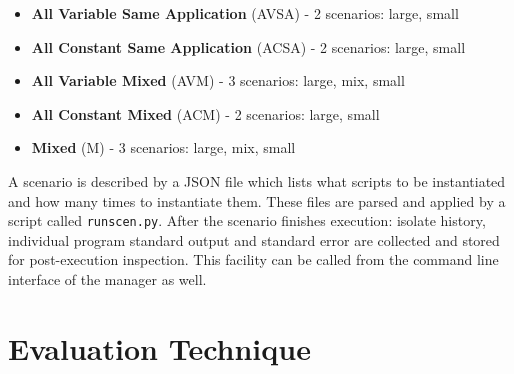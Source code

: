 \documentclass{l4proj}
\begin{document}
\begin{itemize}
\item \textbf{All Variable Same Application} (AVSA) - 2 scenarios: large, small
\item \textbf{All Constant Same Application} (ACSA) - 2 scenarios: large, small
\item \textbf{All Variable Mixed} (AVM) - 3 scenarios: large, mix, small 
\item \textbf{All Constant Mixed} (ACM) - 2 scenarios: large, small
\item \textbf{Mixed} (M) - 3 scenarios: large, mix, small
\end{itemize}
A scenario is described by a JSON file which lists what scripts to be instantiated and how many times to instantiate them. These files are parsed and applied by a script called \texttt{runscen.py}. After the scenario finishes execution: isolate history, individual program standard output and standard error are collected and stored for post-execution inspection. This facility can be called from the command line interface of the manager as well.
\section{Evaluation Technique}
\end{document}
